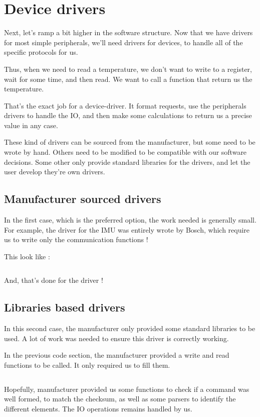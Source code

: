 \section{Device drivers}
Next, let's ramp a bit higher in the software structure. Now that we have
drivers for most simple peripherals, we'll need drivers for devices, to handle
all of the specific protocols for us.

Thus, when we need to read a temperature, we don't want to write to a register,
wait for some time, and then read. We want to call a function that return us
the temperature.

That's the exact job for a device-driver. It format requests, use the
peripherals drivers to handle the IO, and then make some calculations to return
us a precise value in any case.

These kind of drivers can be sourced from the manufacturer, but some need to be
wrote by hand. Others need to be modified to be compatible with our software
decisions. Some other only provide standard libraries for the drivers, and let
the user develop they're own drivers.

\subsection{Manufacturer sourced drivers}
In the first case, which is the preferred option, the work needed is generally
small. For example, the driver for the IMU was entirely wrote by Bosch, which
require us to write only the communication functions !

This look like : \inputminted[linenos, firstline=19471,
    lastline=19484]{cpp}{\Code/drivers/bno055/bno055.cpp}

And, that's done for the driver !

\subsection{Libraries based drivers}
In this second case, the manufacturer only provided some standard libraries to
be used. A lot of work was needed to ensure this driver is correctly working.

In the previous code section, the manufacturer provided a write and read
functions to be called. It only required us to fill them.

\inputminted[linenos, firstline=311, lastline=315]{cpp}{\Code/drivers/teseo/teseo.cpp}

Hopefully, manufacturer provided us some functions to check if a command was
well formed, to match the checksum, as well as some parsers to identify the
different elements. The IO operations remains handled by us.

